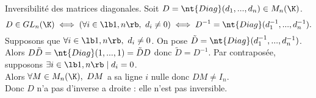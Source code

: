 \documentclass[11pt]{article}
\begin{document}
\begin{prop}{Inversibilité des matrices diagonales.}{}
    Soit $D=\nt{Diag}(d_1,...,d_n)\in M_n(\K)$.
    \begin{equation*}
        D\in GL_n(\K) \iff (\forall i \in \lb1,n\rb, ~ d_i \neq 0) \iff D^{-1}=\nt{Diag}(d_1^{-1},...,d_n^{-1}).
    \end{equation*}
    \tcblower
    Supposons que $\forall i \in \lb1,n\rb, ~ d_i\neq0$. On pose $\tilde{D}=\nt{Diag}(d_1^{-1},...,d_n^{-1})$.\\
    Alors $D\tilde{D}=\nt{Diag}(1,...,1)=\tilde{D}D$ donc $\tilde{D}=D^{-1}$.\n
    Par contraposée, supposons $\exists i \in \lb1,n\rb\mid d_i=0$.\\
    Alors $\forall M\in M_n(\K), ~ DM$ a sa ligne $i$ nulle donc $DM\neq I_n$.\\
    Donc $D$ n'a pas d'inverse a droite : elle n'est pas inversible.
\end{prop}
\end{document}
